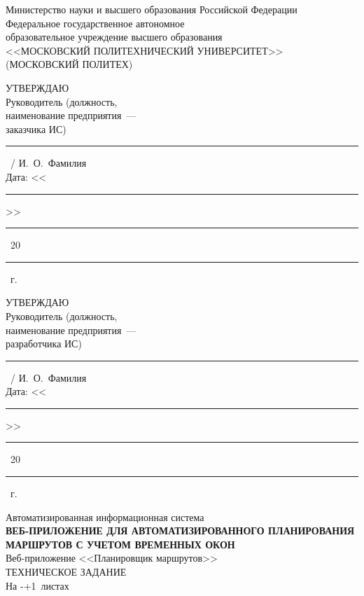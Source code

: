 \newcommand{\tztotalpages}{\number\numexpr\getpagerefnumber{tz:end}-\getpagerefnumber{tz:start}+1\relax}

\label{tz:start}

{

\begin{center}
Министерство науки и высшего образования Российской Федерации\\
Федеральное государственное автономное\\
образовательное учреждение высшего образования\\
<<МОСКОВСКИЙ ПОЛИТЕХНИЧЕСКИЙ УНИВЕРСИТЕТ>>\\
(МОСКОВСКИЙ ПОЛИТЕХ)
\end{center}

\vspace{1.2em}

\noindent
\begin{minipage}[t]{0.47\textwidth}
УТВЕРЖДАЮ\\[1em]
Руководитель (должность,\\
наименование предприятия~---\\
заказчика ИС)\\[1em]
\rule{3cm}{0.4pt}~/ И.~О.~Фамилия\\[0.3em]
Дата: <<\rule{1cm}{0.4pt}>>~\rule{2.4cm}{0.4pt}~20\rule{0.7cm}{0.4pt}~г.
\end{minipage}\hfill
\begin{minipage}[t]{0.47\textwidth}
УТВЕРЖДАЮ\\[1em]
Руководитель (должность,\\
наименование предприятия~---\\
разработчика ИС)\\[1em]
\rule{3cm}{0.4pt}~/ И.~О.~Фамилия\\[0.3em]
Дата: <<\rule{1cm}{0.4pt}>>~\rule{2.4cm}{0.4pt}~20\rule{0.7cm}{0.4pt}~г.
\end{minipage}

\vspace{1.8em}

\begin{center}
Автоматизированная информационная система\\[1em]
{\bfseries ВЕБ-ПРИЛОЖЕНИЕ ДЛЯ АВТОМАТИЗИРОВАННОГО ПЛАНИРОВАНИЯ\\
МАРШРУТОВ С УЧЕТОМ ВРЕМЕННЫХ ОКОН}\\[1em]
Веб-приложение <<Планировщик маршрутов>>\\[1em]
ТЕХНИЧЕСКОЕ ЗАДАНИЕ\\[0.4em]
На \tztotalpages{}~листах
\end{center}

}
